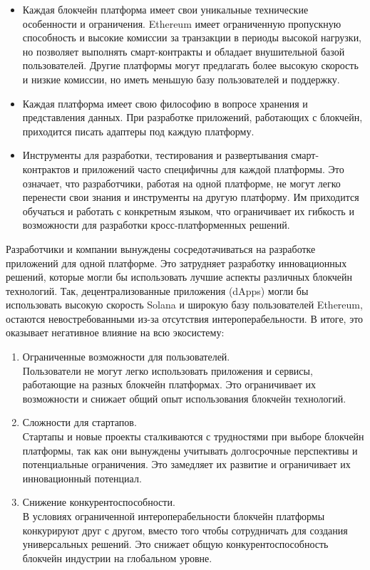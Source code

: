 \begin{itemize}
	\item Каждая блокчейн платформа имеет свои уникальные технические особенности и ограничения. Ethereum имеет ограниченную пропускную способность и высокие комиссии за транзакции в периоды высокой нагрузки, но позволяет выполнять смарт-контракты и обладает внушительной базой пользователей. Другие платформы могут предлагать более высокую скорость и низкие комиссии, но иметь меньшую базу пользователей и поддержку.

	\item Каждая платформа имеет свою философию в вопросе хранения и представления данных. При разработке приложений, работающих с блокчейн, приходится писать адаптеры под каждую платформу.

	\item Инструменты для разработки, тестирования и развертывания смарт-контрактов и приложений часто специфичны для каждой платформы. Это означает, что разработчики, работая на одной платформе, не могут легко перенести свои знания и инструменты на другую платформу. Им приходится обучаться и работать с конкретным языком, что ограничивает их гибкость и возможности для разработки кросс-платформенных решений.
\end{itemize}

Разработчики и компании вынуждены сосредотачиваться на разработке приложений для одной платформе. Это затрудняет разработку инновационных решений, которые могли бы использовать лучшие аспекты различных блокчейн технологий. Так, децентрализованные приложения (dApps) могли бы использовать высокую скорость Solana и широкую базу пользователей Ethereum, остаются невостребованными из-за отсутствия интероперабельности. В итоге, это оказывает негативное влияние на всю экосистему:

\begin{enumerate}
	\item Ограниченные возможности для пользователей.\\
	Пользователи не могут легко использовать приложения и сервисы, работающие на разных блокчейн платформах. Это ограничивает их возможности и снижает общий опыт использования блокчейн технологий.

	\item Сложности для стартапов.\\
	Стартапы и новые проекты сталкиваются с трудностями при выборе блокчейн платформы, так как они вынуждены учитывать долгосрочные перспективы и потенциальные ограничения. Это замедляет их развитие и ограничивает их инновационный потенциал.

	\item Снижение конкурентоспособности.\\
	В условиях ограниченной интероперабельности блокчейн платформы конкурируют друг с другом, вместо того чтобы сотрудничать для создания универсальных решений. Это снижает общую конкурентоспособность блокчейн индустрии на глобальном уровне.
\end{enumerate}

